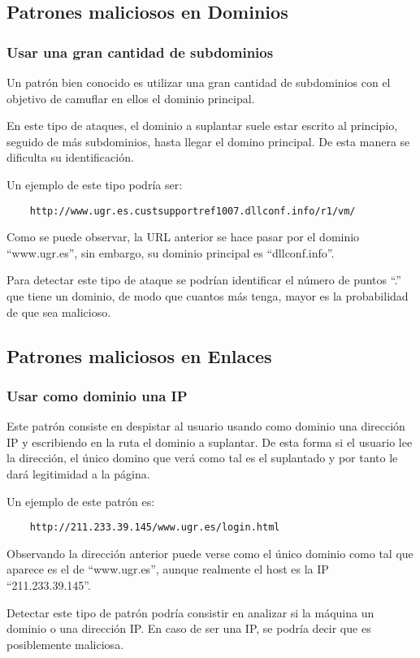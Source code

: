 \subsection{Patrones maliciosos en Dominios}
\subsubsection{Usar una gran cantidad de subdominios}
Un patrón bien conocido es utilizar una gran cantidad de subdominios con el objetivo de camuflar en ellos el dominio principal. 

En este tipo de ataques, el dominio a suplantar suele estar escrito al principio, seguido de más subdominios, hasta llegar el domino principal. De esta manera se dificulta su identificación. 

Un ejemplo de este tipo podría ser: 
\begin{verbatim}
    http://www.ugr.es.custsupportref1007.dllconf.info/r1/vm/
\end{verbatim}
Como se puede observar, la URL anterior se hace pasar por el dominio “www.ugr.es”, sin embargo, su dominio principal es “dllconf.info”.

Para detectar este tipo de ataque se podrían identificar el número de puntos “.” que tiene un dominio, de modo que cuantos más tenga, mayor es la probabilidad de que sea malicioso.

\subsection{Patrones maliciosos en Enlaces}
\subsubsection{Usar como dominio una IP}
Este patrón consiste en despistar al usuario usando como dominio una dirección IP y escribiendo en la ruta el dominio a suplantar. De esta forma si el usuario lee la dirección, el único domino que verá como tal es el suplantado y por tanto le dará legitimidad a la página. 

Un ejemplo de este patrón es: 
\begin{verbatim}
    http://211.233.39.145/www.ugr.es/login.html 
\end{verbatim}
Observando la dirección anterior puede verse como el único dominio como tal que aparece es el de “www.ugr.es”, aunque realmente el host es la IP “211.233.39.145”.

Detectar este tipo de patrón podría consistir en analizar si la máquina un dominio o una dirección IP. En caso de ser una IP, se podría decir que es posiblemente maliciosa. 

